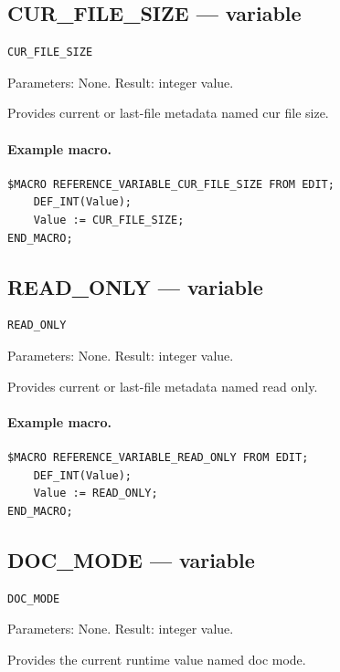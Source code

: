 \documentclass[a4paper,10pt,twoside,openany]{book}
\begin{document}
\label{prim:variable-cur-file-size}
\subsection*{CUR\_FILE\_SIZE --- variable}
\begin{verbatim}
CUR_FILE_SIZE
\end{verbatim}
Parameters: None. Result: integer value.

Provides current or last-file metadata named cur file size.

\paragraph{Example macro.}
\begin{verbatim}
$MACRO REFERENCE_VARIABLE_CUR_FILE_SIZE FROM EDIT;
    DEF_INT(Value);
    Value := CUR_FILE_SIZE;
END_MACRO;
\end{verbatim}

\label{prim:variable-read-only}
\subsection*{READ\_ONLY --- variable}
\begin{verbatim}
READ_ONLY
\end{verbatim}
Parameters: None. Result: integer value.

Provides current or last-file metadata named read only.

\paragraph{Example macro.}
\begin{verbatim}
$MACRO REFERENCE_VARIABLE_READ_ONLY FROM EDIT;
    DEF_INT(Value);
    Value := READ_ONLY;
END_MACRO;
\end{verbatim}

\label{prim:variable-doc-mode}
\subsection*{DOC\_MODE --- variable}
\begin{verbatim}
DOC_MODE
\end{verbatim}
Parameters: None. Result: integer value.

Provides the current runtime value named doc mode.
\end{document}
